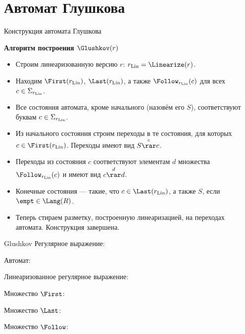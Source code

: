 \section{Автомат Глушкова}
\begin{frame}{Конструкция автомата Глушкова}
  \begin{block}{\bf Алгоритм построения $\Glushkov(r)$}
    \begin{itemize}
      \item Строим линеаризованную версию $r$: $r_{\rm Lin} =\Linearize(r)$.
      \item Находим $\First(r_{\rm Lin})$, $\Last(r_{\rm Lin})$, а также $\Follow_{r_{\rm Lin}}(c)$ для всех $c\in\Sigma_{r_{\rm Lin}}$.
      \item Все состояния автомата, кроме начального (назовём его $S$), соответствуют буквам $c\in\Sigma_{r_{\rm Lin}}$.
      \item Из начального состояния строим переходы в те состояния, для которых $c\in\First(r_{\rm Lin})$. Переходы имеют вид $S\overset{c}{\rar}{c}$.
      \item Переходы из состояния $c$ соответствуют элементам $d$ множества $\Follow_{r_{\rm Lin}}(c)$ и имеют вид $c\overset{d}{\rar}{d}$.
      \item Конечные состояния --- такие, что $c\in\Last(r_{\rm Lin})$, а также $S$, если $\empt\in\Lang(R)$.
      \item Теперь стираем разметку, построенную линеаризацией, на переходах автомата. Конструкция завершена.
    \end{itemize}
  \end{block} %
\end{frame}
\begin{frame}{Glushkov}
	Регулярное выражение:

	Автомат:


	Линеаризованное регулярное выражение:


	Множество $\First$:


	Множество $\Last$:


	Множество $\Follow$:


\end{frame}

